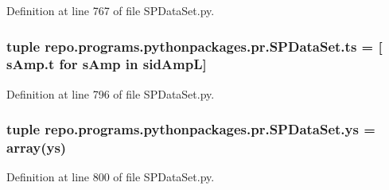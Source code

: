 Definition at line 767 of file S\-P\-Data\-Set.\-py.

\hypertarget{namespacerepo_1_1programs_1_1pythonpackages_1_1pr_1_1SPDataSet_a2e421078d46e1d8f3b0c2d7c8211e1a2}{
\subsubsection[{ts}]{\setlength{\rightskip}{0pt plus 5cm}tuple repo.\-programs.\-pythonpackages.\-pr.\-S\-P\-Data\-Set.\-ts = \mbox{[} s\-Amp.\-t for {\bf s\-Amp} in {\bf sid\-Amp\-L}\mbox{]}}}\label{namespacerepo_1_1programs_1_1pythonpackages_1_1pr_1_1SPDataSet_a2e421078d46e1d8f3b0c2d7c8211e1a2}


Definition at line 796 of file S\-P\-Data\-Set.\-py.

\hypertarget{namespacerepo_1_1programs_1_1pythonpackages_1_1pr_1_1SPDataSet_af4556d66bac96baab9aed887e66ce083}{
\subsubsection[{ys}]{\setlength{\rightskip}{0pt plus 5cm}tuple repo.\-programs.\-pythonpackages.\-pr.\-S\-P\-Data\-Set.\-ys = array(ys)}}\label{namespacerepo_1_1programs_1_1pythonpackages_1_1pr_1_1SPDataSet_af4556d66bac96baab9aed887e66ce083}


Definition at line 800 of file S\-P\-Data\-Set.\-py.

